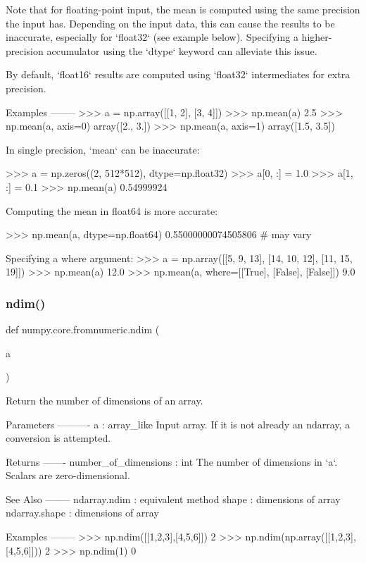 \begin{DoxyVerb}
Note that for floating-point input, the mean is computed using the
same precision the input has.  Depending on the input data, this can
cause the results to be inaccurate, especially for `float32` (see
example below).  Specifying a higher-precision accumulator using the
`dtype` keyword can alleviate this issue.

By default, `float16` results are computed using `float32` intermediates
for extra precision.

Examples
--------
>>> a = np.array([[1, 2], [3, 4]])
>>> np.mean(a)
2.5
>>> np.mean(a, axis=0)
array([2., 3.])
>>> np.mean(a, axis=1)
array([1.5, 3.5])

In single precision, `mean` can be inaccurate:

>>> a = np.zeros((2, 512*512), dtype=np.float32)
>>> a[0, :] = 1.0
>>> a[1, :] = 0.1
>>> np.mean(a)
0.54999924

Computing the mean in float64 is more accurate:

>>> np.mean(a, dtype=np.float64)
0.55000000074505806 # may vary

Specifying a where argument:
>>> a = np.array([[5, 9, 13], [14, 10, 12], [11, 15, 19]])
>>> np.mean(a)
12.0
>>> np.mean(a, where=[[True], [False], [False]])
9.0\end{DoxyVerb}
 \mbox{\label{namespacenumpy_1_1core_1_1fromnumeric_a4eb4459882f37149eab23c97014fe487}} 
\subsubsection{\texorpdfstring{ndim()}{ndim()}}
{\footnotesize\ttfamily def numpy.\+core.\+fromnumeric.\+ndim (\begin{DoxyParamCaption}\item[{}]{a }\end{DoxyParamCaption})}

\begin{DoxyVerb}Return the number of dimensions of an array.

Parameters
----------
a : array_like
    Input array.  If it is not already an ndarray, a conversion is
    attempted.

Returns
-------
number_of_dimensions : int
    The number of dimensions in `a`.  Scalars are zero-dimensional.

See Also
--------
ndarray.ndim : equivalent method
shape : dimensions of array
ndarray.shape : dimensions of array

Examples
--------
>>> np.ndim([[1,2,3],[4,5,6]])
2
>>> np.ndim(np.array([[1,2,3],[4,5,6]]))
2
>>> np.ndim(1)
0\end{DoxyVerb}
 \mbox{\label{namespacenumpy_1_1core_1_1fromnumeric_a6f66babbc15dfab40705d3140dd386b1}} 
